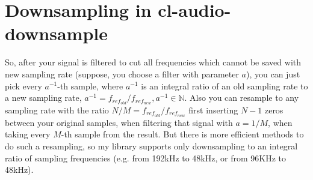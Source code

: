 \documentclass[a4paper,11pt,fleqn]{article}
\begin{document}
\section{Downsampling in cl-audio-downsample}
So, after your signal is filtered to cut all frequencies which cannot be saved with new sampling rate (suppose, you choose a filter with parameter $a$), you can just pick every $a^{-1}$-th sample, where
$a^{-1}$ is an integral ratio of an old sampling rate to a new sampling rate, $a^{-1} = f_{ref_{old}}/f_{ref_{new}}, a^{-1} \in \mathbb{N}$. Also you can resample to any sampling rate with the ratio
$N/M = f_{ref_{old}}/f_{ref_{new}}$ first inserting $N-1$ zeros between your original samples, when filtering that signal with $a=1/M$, when taking every $M$-th sample from the result. But there is more
efficient methods to do such a resampling, so my library supports only downsampling to an integral ratio of sampling frequencies (e.g. from 192kHz to 48kHz, or from 96KHz to 48kHz).
\end{document}
